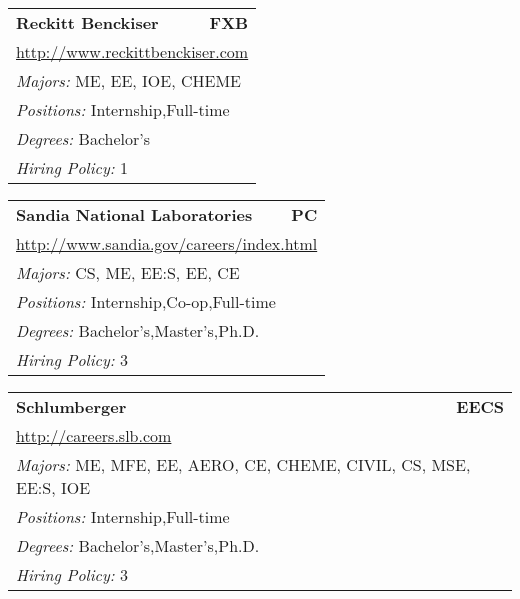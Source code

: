 \documentclass[twoside]{article}
\begin{document}
\begin{center}
\begin{multicols}{3}
\begin{FlushLeft}
\begin{minipage}{\columnwidth}
\end{minipage}
 
\begin{minipage}{\columnwidth}\begin{tabularx}{.95\columnwidth}{Xr}
                 {\Large\bf Reckitt Benckiser} & {\Large\bf FXB}\\
    \multicolumn{2}{p{.95\columnwidth}}{\url{http://www.reckittbenckiser.com}}\\
    \multicolumn{2}{p{.95\columnwidth}}{\emph{Majors:} ME, EE, IOE, CHEME}\\
    \multicolumn{2}{p{.95\columnwidth}}{\emph{Positions:} Internship,Full-time}\\
    \multicolumn{2}{p{.95\columnwidth}}{\emph{Degrees:} Bachelor's}\\
    \multicolumn{2}{p{.95\columnwidth}}{\emph{Hiring Policy:} 1}\\
    \end{tabularx}
    
\end{minipage}
 
\begin{minipage}{\columnwidth}\begin{tabularx}{.95\columnwidth}{Xr}
                 {\Large\bf Sandia National Laboratories} & {\Large\bf PC}\\
    \multicolumn{2}{p{.95\columnwidth}}{\url{http://www.sandia.gov/careers/index.html}}\\
    \multicolumn{2}{p{.95\columnwidth}}{\emph{Majors:} CS, ME, EE:S, EE, CE}\\
    \multicolumn{2}{p{.95\columnwidth}}{\emph{Positions:} Internship,Co-op,Full-time}\\
    \multicolumn{2}{p{.95\columnwidth}}{\emph{Degrees:} Bachelor's,Master's,Ph.D.}\\
    \multicolumn{2}{p{.95\columnwidth}}{\emph{Hiring Policy:} 3}\\
    \end{tabularx}
    
\end{minipage}
 
\begin{minipage}{\columnwidth}\begin{tabularx}{.95\columnwidth}{Xr}
                 {\Large\bf Schlumberger} & {\Large\bf EECS}\\
    \multicolumn{2}{p{.95\columnwidth}}{\url{http://careers.slb.com}}\\
    \multicolumn{2}{p{.95\columnwidth}}{\emph{Majors:} ME, MFE, EE, AERO, CE, CHEME, CIVIL, CS, MSE, EE:S, IOE}\\
    \multicolumn{2}{p{.95\columnwidth}}{\emph{Positions:} Internship,Full-time}\\
    \multicolumn{2}{p{.95\columnwidth}}{\emph{Degrees:} Bachelor's,Master's,Ph.D.}\\
    \multicolumn{2}{p{.95\columnwidth}}{\emph{Hiring Policy:} 3}\\
    \end{tabularx}
    

\end{minipage}
\end{FlushLeft}
\end{multicols}
\end{center}
\end{document}
